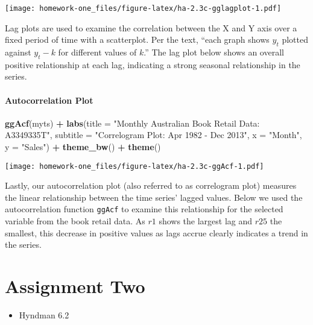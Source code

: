 \documentclass[openany]{book}
\newenvironment{Shaded}{\begin{snugshade}}{\end{snugshade}}
\newcommand{\DataTypeTok}[1]{\textcolor[rgb]{0.13,0.29,0.53}{#1}}
\newcommand{\KeywordTok}[1]{\textcolor[rgb]{0.13,0.29,0.53}{\textbf{#1}}}
\newcommand{\NormalTok}[1]{#1}
\newcommand{\OperatorTok}[1]{\textcolor[rgb]{0.81,0.36,0.00}{\textbf{#1}}}
\newcommand{\StringTok}[1]{\textcolor[rgb]{0.31,0.60,0.02}{#1}}
\providecommand{\tightlist}{%
  \setlength{\itemsep}{0pt}\setlength{\parskip}{0pt}}
\begin{document}
\texttt{[image: homework-one\_files/figure-latex/ha-2.3c-gglagplot-1.pdf]}

Lag plots are used to examine the correlation between the X and Y axis over a fixed period of time with a scatterplot. Per the text, ``each graph shows \(y_{t}\) plotted against \(y_{t} - k\) for different values of \(k\).'' The lag plot below shows an overall positive relationship at each lag, indicating a strong seasonal relationship in the series.

\hypertarget{autocorrelation-plot}{%
\subsubsection{Autocorrelation Plot}\label{autocorrelation-plot}}

\begin{Shaded}
\begin{Highlighting}[]
\KeywordTok{ggAcf}\NormalTok{(myts) }\OperatorTok{+}\StringTok{ }\KeywordTok{labs}\NormalTok{(}\DataTypeTok{title =} \StringTok{"Monthly Australian Book Retail Data: A3349335T"}\NormalTok{, }
  \DataTypeTok{subtitle =} \StringTok{"Correlogram Plot: Apr 1982 - Dec 2013"}\NormalTok{, }\DataTypeTok{x =} \StringTok{"Month"}\NormalTok{, }
  \DataTypeTok{y =} \StringTok{"Sales"}\NormalTok{) }\OperatorTok{+}\StringTok{ }\KeywordTok{theme_bw}\NormalTok{() }\OperatorTok{+}\StringTok{ }\KeywordTok{theme}\NormalTok{()}
\end{Highlighting}
\end{Shaded}

\texttt{[image: homework-one\_files/figure-latex/ha-2.3c-ggAcf-1.pdf]}

Lastly, our autocorrelation plot (also referred to as correlogram plot) measures the linear relationship between the time series' lagged values. Below we used the autocorrelation function \texttt{ggAcf} to examine this relationship for the selected variable from the book retail data. As \(r1\) shows the largest lag and \(r25\) the smallest, this decrease in positive values as lags accrue clearly indicates a trend in the series.

\hypertarget{assignment-two}{%
\chapter{Assignment Two}\label{assignment-two}}

\begin{itemize}
\tightlist
\item
  Hyndman 6.2
\end{itemize}
\end{document}
